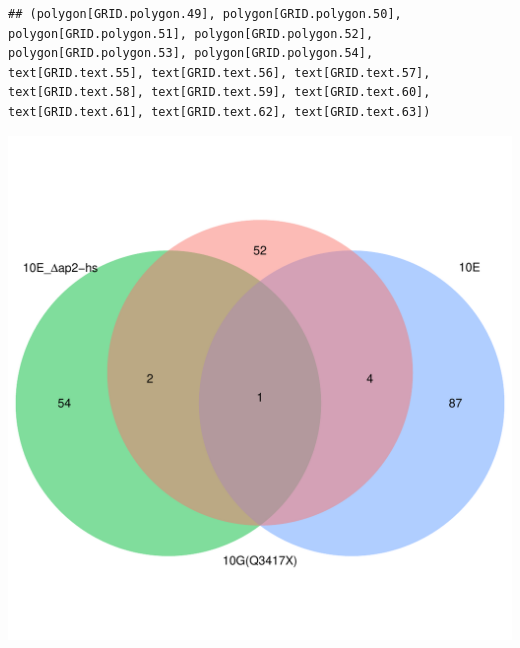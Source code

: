 \documentclass{article}\usepackage[]{graphicx}\usepackage[]{color}
\makeatletter
\newenvironment{kframe}{%
 \def\at@end@of@kframe{}%
 \ifinner\ifhmode%
  \def\at@end@of@kframe{\end{minipage}}%
  \begin{minipage}{\columnwidth}%
 \fi\fi%
 \def\FrameCommand##1{\hskip\@totalleftmargin \hskip-\fboxsep
 \colorbox{shadecolor}{##1}\hskip-\fboxsep
     \hskip-\linewidth \hskip-\@totalleftmargin \hskip\columnwidth}%
 \MakeFramed {\advance\hsize-\width
   \@totalleftmargin\z@ \linewidth\hsize
   \@setminipage}}%
 {\par\unskip\endMakeFramed%
 \at@end@of@kframe}
\newenvironment{knitrout}{}{} %
\makeatother
\begin{document}
\begin{knitrout}
\color{fgcolor}\begin{kframe}
\begin{verbatim}
## (polygon[GRID.polygon.49], polygon[GRID.polygon.50], polygon[GRID.polygon.51], polygon[GRID.polygon.52], polygon[GRID.polygon.53], polygon[GRID.polygon.54], text[GRID.text.55], text[GRID.text.56], text[GRID.text.57], text[GRID.text.58], text[GRID.text.59], text[GRID.text.60], text[GRID.text.61], text[GRID.text.62], text[GRID.text.63])
\end{verbatim}
\end{kframe}

{\centering \includegraphics[width=1\linewidth,height=.4\textheight]{figure/minimal-venn_t1_3fc_down_venn-1} 

}



\end{knitrout}
\end{document}
